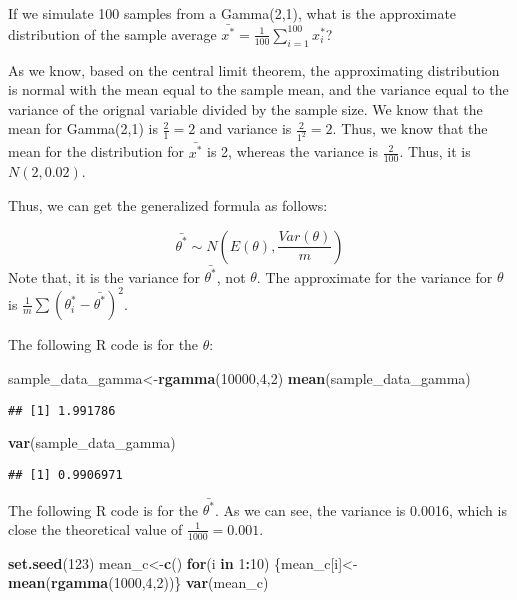 \documentclass[]{book}
\newenvironment{Shaded}{\begin{snugshade}}{\end{snugshade}}
\newcommand{\KeywordTok}[1]{\textcolor[rgb]{0.13,0.29,0.53}{\textbf{#1}}}
\newcommand{\DecValTok}[1]{\textcolor[rgb]{0.00,0.00,0.81}{#1}}
\newcommand{\ControlFlowTok}[1]{\textcolor[rgb]{0.13,0.29,0.53}{\textbf{#1}}}
\newcommand{\OperatorTok}[1]{\textcolor[rgb]{0.81,0.36,0.00}{\textbf{#1}}}
\newcommand{\NormalTok}[1]{#1}
\begin{document}
If we simulate 100 samples from a Gamma(2,1), what is the approximate
distribution of the sample average
\(\bar{x^*}=\frac{1}{100} \sum_{i=1}^{100} x_i^*\)?

As we know, based on the central limit theorem, the approximating
distribution is normal with the mean equal to the sample mean, and the
variance equal to the variance of the orignal variable divided by the
sample size. We know that the mean for Gamma(2,1) is \(\frac{2}{1}=2\)
and variance is \(\frac{2}{1^2}=2\). Thus, we know that the mean for the
distribution for \(\bar{x^*}\) is 2, whereas the variance is
\(\frac{2}{100}\). Thus, it is \(N(2,0.02)\).

Thus, we can get the generalized formula as follows:

\[\bar{\theta^*} \sim N(E(\theta), \frac{Var(\theta)}{m})\] Note that,
it is the variance for \(\bar{\theta^*}\), not \(\theta\). The
approximate for the variance for \(\theta\) is
\(\frac{1}{m}\sum(\theta_i^*-\bar{\theta^*})^2\).

The following R code is for the \(\theta\):

\begin{Shaded}
\begin{Highlighting}[]
\NormalTok{sample_data_gamma<-}\KeywordTok{rgamma}\NormalTok{(}\DecValTok{10000}\NormalTok{,}\DecValTok{4}\NormalTok{,}\DecValTok{2}\NormalTok{)}
\KeywordTok{mean}\NormalTok{(sample_data_gamma)}
\end{Highlighting}
\end{Shaded}

\begin{verbatim}
## [1] 1.991786
\end{verbatim}

\begin{Shaded}
\begin{Highlighting}[]
\KeywordTok{var}\NormalTok{(sample_data_gamma)}
\end{Highlighting}
\end{Shaded}

\begin{verbatim}
## [1] 0.9906971
\end{verbatim}

The following R code is for the \(\bar{\theta^*}\). As we can see, the
variance is 0.0016, which is close the theoretical value of
\(\frac{1}{1000}=0.001\).

\begin{Shaded}
\begin{Highlighting}[]
\KeywordTok{set.seed}\NormalTok{(}\DecValTok{123}\NormalTok{)}
\NormalTok{mean_c<-}\KeywordTok{c}\NormalTok{()}
\ControlFlowTok{for}\NormalTok{(i }\ControlFlowTok{in} \DecValTok{1}\OperatorTok{:}\DecValTok{10}\NormalTok{)}
\NormalTok{\{mean_c[i]<-}\KeywordTok{mean}\NormalTok{(}\KeywordTok{rgamma}\NormalTok{(}\DecValTok{1000}\NormalTok{,}\DecValTok{4}\NormalTok{,}\DecValTok{2}\NormalTok{))\}}
\KeywordTok{var}\NormalTok{(mean_c)}
\end{Highlighting}
\end{Shaded}
\end{document}
